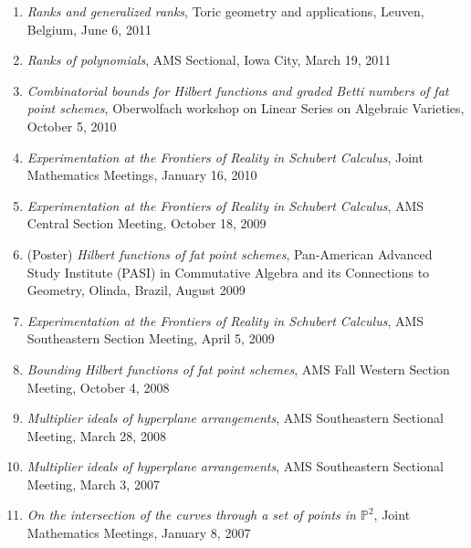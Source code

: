 \documentclass[12pt]{article}
\begin{document}
\begin{enumerate}
\item \textit{Ranks and generalized ranks},
Toric geometry and applications, Leuven, Belgium, June 6, 2011

\item \textit{Ranks of polynomials}, AMS Sectional, Iowa City, March 19, 2011

\item \textit{Combinatorial bounds for Hilbert functions and graded Betti numbers of fat point schemes},
Oberwolfach workshop on Linear Series on Algebraic Varieties, October 5, 2010

\item \textit{Experimentation at the Frontiers of Reality in Schubert Calculus},
Joint Mathematics Meetings, January 16, 2010

\item \textit{Experimentation at the Frontiers of Reality in Schubert Calculus},
AMS Central Section Meeting, October 18, 2009

\item (Poster) \textit{Hilbert functions of fat point schemes},
Pan-American Advanced Study Institute (PASI) 
in 
Commutative Algebra and its Connections to Geometry,
Olinda, Brazil, August 2009

\item \textit{Experimentation at the Frontiers of Reality in Schubert Calculus},
AMS Southeastern Section Meeting, April 5, 2009

\item \textit{Bounding Hilbert functions of fat point schemes},
AMS Fall Western Section Meeting, October 4, 2008

\item \textit{Multiplier ideals of hyperplane arrangements},
AMS Southeastern Sectional Meeting, March 28, 2008

\item \textit{Multiplier ideals of hyperplane arrangements},
AMS Southeastern Sectional Meeting, March 3, 2007

\item \textit{On the intersection of the curves through a set of points in $\mathbb{P}^2$},
Joint Mathematics Meetings, January 8, 2007




\end{enumerate}
\end{document}
